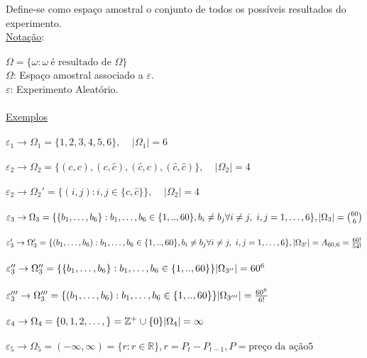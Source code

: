 \documentclass[a4paper,12pt]{article}
\begin{document}
Define-se como espaço amostral o conjunto de todos os possíveis resultados do experimento.
\\

\underline{Notação}:\\
\\
$\Omega=\{\omega:\omega \ \text{é resultado de } \Omega\}$\\
$\Omega$: Espaço amostral associado a $\varepsilon$.\\
$\varepsilon$: Experimento Aleatório.\\
\\
\underline{Exemplos}\\
\\
$\varepsilon_1 \rightarrow \Omega_1=\{1,2,3,4,5,6\}, \ \ \ \ \ |\Omega_1|=6 $\\
\\
$\varepsilon_2 \rightarrow \Omega_2=\{(c,c),(c,\hat{c}),(\hat{c},c),(\hat{c},\hat{c})\},  \ \ \ \ \ |\Omega_2|=4 $\\
\\
$\varepsilon_2 \rightarrow \Omega_2'=\{(i,j): i,j \in \{c,\hat{c}\}\}, \ \ \ \ \ |\Omega_2|=4  $\\
\\
$\varepsilon_3 \rightarrow \Omega_3=\{\{b_1,\dots,b_6\}: b_1,\dots,b_6 \in \{1,..,60\},b_i\ne b_j \forall i\ne j, \ i,j =1,\ldots,6\},\\
|\Omega_3| = \binom{60}{6} 
 $\\
 \\
$\varepsilon_3' \rightarrow \Omega_3'=\{(b_1,\dots,b_6): b_1,\dots,b_6 \in \{1,..,60\},b_i\ne b_j \forall i\ne j, \ i,j =1,\ldots,6\},\\
|\Omega_{3'}| = A_{60,6} = \frac{60!}{54!}
$\\
 \\
$\varepsilon_3'' \rightarrow \Omega_3''=\{\{b_1,\dots,b_6\}: b_1,\dots,b_6 \in \{1,..,60\}\}\\
|\Omega_{3''}| = 60^6
$\\
 \\
$\varepsilon_3''' \rightarrow \Omega_3'''=\{(b_1,\dots,b_6): b_1,\dots,b_6 \in \{1,..,60\}\}\\
|\Omega_{3'''}| = \frac{60^6}{6!}
$\\
 \\
$\varepsilon_4 \rightarrow \Omega_4=\{0,1,2,\ldots,\} = \mathbb{Z^+}\cup \{0\}\\
|\Omega_{4}| = \infty
$\\
 \\
$\varepsilon_5 \rightarrow \Omega_5=(-\infty,\infty)=\{r:r\in \mathbb{R} \}, r=P_t-P_{t-1}, P=\text{preço da ação}5
$\\
\end{document}
